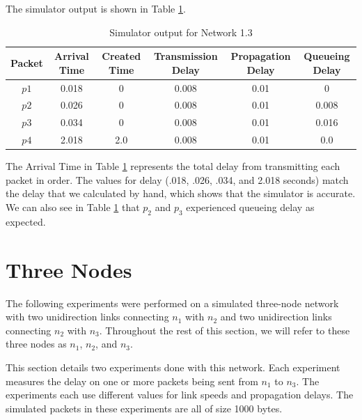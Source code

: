 \documentclass[11pt]{article}
\begin{document}
\begin{description}
\medskip

The simulator output is shown in Table \ref{tbl1.3}.

\smallskip

\begin{table}[H]
\begin{center}
\caption{Simulator output for Network 1.3}
\label{tbl1.3}
\begin{tabular}{cccccc}
  \toprule
  Packet & Arrival Time & Created Time & Transmission Delay & Propagation Delay & Queueing Delay\\
  \midrule
  $p1$ & 0.018 & 0 & 0.008 & 0.01 & 0\\
  $p2$ & 0.026 & 0 & 0.008 & 0.01 & 0.008\\
  $p3$ & 0.034 & 0 & 0.008 & 0.01 & 0.016\\
  $p4$ & 2.018 & 2.0 & 0.008 & 0.01 & 0.0\\
  \bottomrule
\end{tabular}
\end{center}
\end{table}

\smallskip

The Arrival Time in Table \ref{tbl1.3} represents the total delay from transmitting each packet in order. The values for delay (.018, .026, .034, and 2.018 seconds) match the delay that we calculated by hand, which shows that the simulator is accurate. We can also see in Table \ref{tbl1.3} that $p_2$ and $p_3$ experienced queueing delay as expected.

\end{description}

\section{Three Nodes}

The following experiments were performed on a simulated three-node network with two unidirection links connecting $n_1$ with $n_2$ and two unidirection links connecting $n_2$ with $n_3$. Throughout the rest of this section, we will refer to these three nodes as $n_1$, $n_2$, and $n_3$.

This section details two experiments done with this network. Each experiment measures the delay on one or more packets being sent from $n_1$ to $n_3$. The experiments each use different values for link speeds and propagation delays. The simulated packets in these experiments are all of size 1000 bytes.
\end{document}
